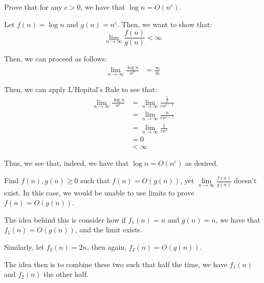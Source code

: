 \documentclass[openany]{book}
\begin{document}
\begin{hw}
	Prove that for any $c > 0$, we have that $\log n = O(n^{c})$.
\end{hw}
\begin{solution}
	Let $f(n) = \log n$ and $g(n) = n^{c}$. Then, we want to show that:
	\begin{equation*}
		\lim_{n\rightarrow\infty} \frac{f(n)}{g(n)} < \infty
	\end{equation*}
	
	Then, we can proceed as follows:
	\begin{align*}
		\lim_{n\rightarrow\infty} \frac{\log n}{n^{c}} &= \frac{\infty}{\infty}
	\end{align*}
	
	Then, we can apply L'Hopital's Rule to see that:
	\begin{align*}
		\lim_{n\rightarrow\infty} \frac{\log n}{n^{c}} &= \lim_{n\rightarrow\infty} \frac{\frac{1}{n}}{cn^{c-1}} \\
		&= \lim_{n\rightarrow\infty} \frac{n}{cn^{c+1}} \\
		&= \lim_{n\rightarrow\infty} \frac{1}{cn^{c}} \\
		&= 0 \\
		&< \infty
	\end{align*}
	
	Thus, we see that, indeed, we have that $\log n = O(n^{c})$ as desired.
\end{solution}

\begin{hw}
	Find $f(n), g(n) \geq 0$ such that $f(n) = O(g(n))$, yet $\lim\limits_{n\rightarrow\infty} \frac{f(n)}{g(n)}$ doesn't exist. In this case, we would be unable to use limits to prove $f(n) = O(g(n))$.
\end{hw}
\begin{solution}
	The idea behind this is consider how if $f_1(n) = n$ and $g(n) = n$, we have that $f_1(n) = O(g(n))$, and the limit exists.
	
	Similarly, let $f_2(n) = 2n$, then again, $f_2(n) = O(g(n))$.
	
	The idea then is to combine these two such that half the time, we have $f_1(n)$ and $f_2(n)$ the other half.
\end{solution}
\end{document}
